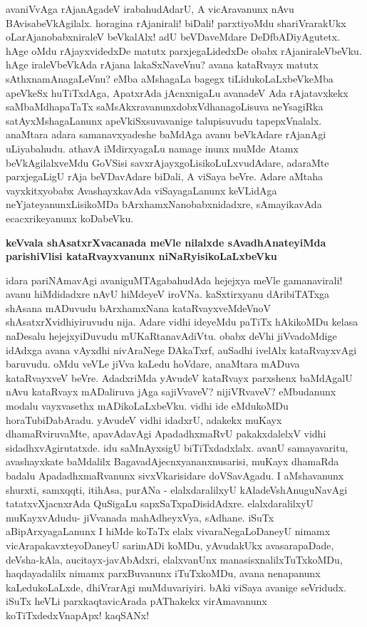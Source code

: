 \noindent
avaniVvAga rAjanAgadeV irabahudAdarU, A vicAravanunx nAvu BAvisabeVkAgilalx. horagina rAjanirali! biDali! parxtiyoMdu shariVrarakUkx oLarAjanobabxniraleV beVkalAlx! adU beVDaveMdare DeDfbADiyAgutetx. hAge oMdu rAjayxvidedxDe matutx parxjegaLidedxDe obabx rAjaniraleVbeVku. hAge iraleVbeVkAda rAjana lakaSxNaveVnu? avana kataRvayx matutx sAthxnamAnagaLeVnu? eMba aMshagaLa bagegx tiLidukoLaLxbeVkeMba apeVkeSx huTiTxdAga, ApatxrAda jAcnxnigaLu avanadeV Ada rAjatavxkekx saMbaMdhapaTaTx saMsAkxravanunxdobxVdhanagoLisuva neYsagiRka satAyxMshagaLanunx apeVkiSxsuvavanige talupisuvudu tapepxVnalalx. anaMtara adara samanavxyadeshe baMdAga avanu beVkAdare rAjanAgi uLiyabahudu. athavA iMdirxyagaLu namage inunx muMde Atamx beVkAgilalxveMdu GoVSisi savxrAjayxgoLisikoLuLxvudAdare, adaraMte parxjegaLigU rAja beVDavAdare biDali, A viSaya beVre. Adare aMtaha vayxkitxyobabx AvashayxkavAda viSayagaLanunx keVLidAga neYjateyanunxLisikoMDa bArxhamxNanobabxnidadxre, sAmayikavAda ecacxrikeyanunx koDabeVku.

{\bigskip
\noindent
{\large\bf keVvala shAsatxrXvacanada meVle nilalxde sAvadhAnateyiMda parishiVlisi kataRvayxvanunx niNaRyisikoLaLxbeVku}}\label{page253a}
\medskip

\noindent
idara pariNAmavAgi avaniguMTAgabahudAda hejejxya meVle gamanavirali! avanu hiMdidadxre nAvU hiMdeyeV iroVNa. kaSxtirxyanu dAribiTATxga shAsana mADuvudu bArxhamxNana kataRvayxveMdeVnoV shAsatxrXvidhiyiruvudu nija. Adare vidhi ideyeMdu paTiTx hAkikoMDu kelasa naDesalu hejejxyiDuvudu mUKaRtanavAdiVtu. obabx deVhi jiVvadoMdige idAdxga avana vAyxdhi nivAraNege DAkaTxrf, auSadhi ivelAlx kataRvayxvAgi baruvudu. oMdu veVLe jiVva kaLedu hoVdare, anaMtara mADuva kataRvayxveV beVre. AdadxriMda yAvudeV kataRvayx parxshenx baMdAgalU nAvu kataRvayx mADaliruva jAga sajiVvaveV? nijiVRvaveV? eMbudanunx modalu vayxvasethx mADikoLaLxbeVku. vidhi ide eMdukoMDu horaTubiDabAradu. yAvudeV vidhi idadxrU, adakekx muKayx dhamaRviruvaMte, apavAdavAgi ApadadhxmaRvU pakakxdalelxV vidhi sidadhxvAgirutatxde. idu saMnAyxsigU biTiTxdadxlalx. avanU samayavaritu, avashayxkate baMdalilx BagavadAjecnxyananxnusarisi, muKayx dhamaRda badalu ApadadhxmaRvanunx sivxVkarisidare doVSavAgadu. I aMshavanunx shurxti, samxqqti, itihAsa, purANa - elalxdaralilxyU kAladeVshAnuguNavAgi tatatxvXjacnxrAda QuSigaLu sapxSaTxpaDisidAdxre. elalxdaralilxyU muKayxvAdudu- jiVvanada mahAdheyxVya, sAdhane. iSuTx aBipArxyagaLanunx I hiMde koTaTx elalx vivaraNegaLoDaneyU nimamx vicArapakavxteyoDaneyU sarimADi
koMDu, yAvudakUkx avasarapaDade, deVsha-kAla, aucitayx-javAbAdxri, elalxvanUnx manasisxnalilxTuTxkoMDu,
 haqdayadalilx nimamx parxBuvanunx iTuTxkoMDu, avana nenapanunx kaLedukoLaLxde, dhiVrarAgi muMduvariyiri. bAki viSaya avanige seVridudx. iSuTx heVLi parxkaqtavicArada pAThakekx virAmavanunx koTiTxdedxVnapApx! kaqSANx!

